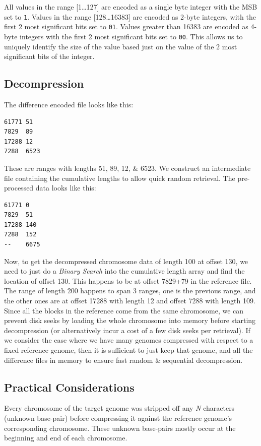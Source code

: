 \documentclass[11pt]{article}
\begin{document}
All values in the range [1\ldots{}127] are encoded as a single byte
integer with the MSB set to \texttt{1}. Values in the range
[128\ldots{}16383] are encoded as 2-byte integers, with the first 2
most significant bits set to \texttt{01}. Values greater than 16383
are encoded as 4-byte integers with the first 2 most significant bits
set to \texttt{00}. This allows us to uniquely identify the size of
the value based just on the value of the 2 most significant bits of
the integer.

\subsection{Decompression}

The difference encoded file looks like this:
\begin{verbatim}
61771 51
7829  89
17288 12
7288  6523
\end{verbatim}

These are ranges with lengths 51, 89, 12, \& 6523. We construct an
intermediate file containing the cumulative lengths to allow quick
random retrieval. The pre-processed data looks like this:

\begin{verbatim}
61771 0
7829  51
17288 140
7288  152
--    6675
\end{verbatim}

Now, to get the decompressed chromosome data of length 100 at offset
130, we need to just do a \textit{Binary Search} into the cumulative
length array and find the location of offset 130. This happens to be
at offset 7829+79 in the reference file. The range of length 200
happens to span 3 ranges, one is the previous range, and the other
ones are at offset 17288 with length 12 and offset 7288 with length
109. Since all the blocks in the reference come from the same
chromosome, we can prevent disk seeks by loading the whole chromosome
into memory before starting decompression (or alternatively incur a
cost of a few disk seeks per retrieval). If we consider the case where
we have many genomes compressed with respect to a fixed reference
genome, then it is sufficient to just keep that genome, and all the
difference files in memory to ensure fast random \& sequential
decompression.


\subsection{Practical Considerations}

Every chromosome of the target genome was stripped off any \textit{N}
characters (unknown base-pair) before compressing it against the
reference genome's corresponding chromosome. These unknown base-pairs
mostly occur at the beginning and end of each chromosome.
\end{document}
